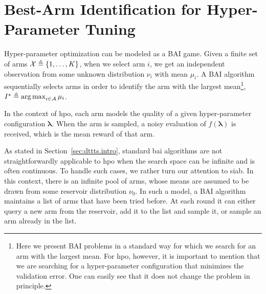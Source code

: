 \section{Best-Arm Identification for Hyper-Parameter Tuning}\label{sec:dttts.bai}

Hyper-parameter optimization can be modeled as a BAI game. Given a finite set of arms $\mathcal{X} \triangleq \{1,\ldots,K\}$, when we select arm $i$, we get an independent observation from some unknown distribution $\nu_i$ with mean $\mu_i$. A BAI algorithm sequentially selects arms in order to identify the arm with the largest mean\footnote{Here we present BAI problems in a standard way for which we search for an arm with the largest mean. For \gls{hpo}, however, it is important to mention that we are searching for a hyper-parameter configuration that minimizes the validation error. One can easily see that it does not change the problem in principle.}, $I^\star \triangleq \operatorname*{arg\,max}_{i\in\mathcal{A}}\mu_i$. 

In the context of \gls{hpo}, each arm models the quality of a given hyper-parameter configuration $\bm\lambda$. When the arm is sampled, a noisy evaluation of $f(\bm\lambda)$ is received, which is the mean reward of that arm.


As stated in Section~\ref{sec:dttts.intro}, standard \gls{bai} algorithms are not straightforwardly applicable to \gls{hpo} when the search space can be infinite and is often continuous. To handle such cases, we rather turn our attention to \gls{siab}. In this context, there is an infinite pool of arms, whose means are assumed to be drawn from some \gls{reservoir} distribution $\nu_0$. In such a model, a BAI algorithm maintains a list of arms that have been tried before. At each round it can either query a new arm from the reservoir, add it to the list and sample it, or sample an arm already in the list.

